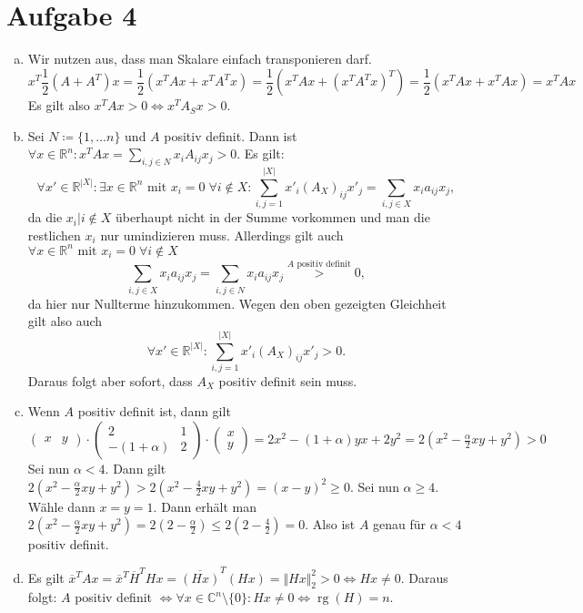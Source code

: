 \documentclass{article}
\theoremstyle{definition}
\newcommand{\equals}{\Longleftrightarrow}
\newcommand{\R}{\mathbb{R}}
\newcommand{\C}{\mathbb{C}}
\newcommand{\rg}{\operatorname{rg}}
\begin{document}
\section*{Aufgabe 4}
\begin{enumerate}[(a)]
	\item Wir nutzen aus, dass man Skalare einfach transponieren darf. 
	$$x^T \frac{1}{2}(A + A^T)x = \frac{1}{2}(x^TAx + x^TA^Tx) = \frac{1}{2}(x^TAx + (x^TA^Tx)^T) = \frac{1}{2}(x^TAx + x^TAx) = x^TAx$$
	Es gilt also $x^TAx> 0 \equals x^TA_Sx > 0$.
	\item Sei $N \coloneqq \{1, \dots n\}$ und $A$ positiv definit. Dann ist $\forall x\in \R^n: x^T Ax = \sum_{i,j \in N} x_i A_{ij}x_j > 0$. Es gilt: $$\forall x' \in \R^{|X|}: \exists x \in \R^n\text{ mit } x_i = 0\; \forall  i \notin X: \sum_{i,j = 1}^{|X|} x'_i (A_X)_{ij}x'_j = \sum_{i,j\in X} x_i a_{ij}x_j,$$ da die $x_i | i \notin X$ überhaupt nicht in der Summe vorkommen und man die restlichen $x_i$ nur umindizieren muss. Allerdings gilt auch $\forall x \in \R^n\text{ mit } x_i = 0\; \forall i \notin X$ $$\sum_{i,j\in X} x_i a_{ij}x_j = \sum_{i,j\in N} x_i a_{ij}x_j \overset{A \text{ positiv definit}}{>} 0,$$ da hier nur Nullterme hinzukommen. Wegen den oben gezeigten Gleichheit gilt also auch 
	$$\forall x' \in \R^{|X|}: \sum_{i,j = 1}^{|X|} x'_i (A_X)_{ij}x'_j >0.$$ Daraus folgt aber sofort, dass $A_X$ positiv definit sein muss.
	\item Wenn $A$ positiv definit ist, dann gilt$\begin{pmatrix}
		x & y
	\end{pmatrix}\cdot \begin{pmatrix}
		2 & 1\\
		-(1+\alpha) & 2
	\end{pmatrix} \cdot \begin{pmatrix}
		x \\y
	\end{pmatrix} = 2x^2 - (1 + \alpha)yx + 2y^2 = 2 (x^2 - \frac{\alpha}{2}xy + y^2) >0$
	Sei nun $\alpha < 4$. Dann gilt $2 (x^2 - \frac{\alpha}{2}xy + y^2) > 2 (x^2 - \frac{4}{2}xy + y^2) = (x-y)^2 \geq 0$. Sei nun $\alpha \geq 4$. Wähle dann $x = y = 1$. Dann erhält man $2(x^2 - \frac{\alpha}{2}xy + y^2) = 2(2 - \frac{\alpha}{2}) \leq 2(2-\frac{4}{2}) = 0$. Also ist $A$ genau für $\alpha <4$ positiv definit.
	\item Es gilt $\overline{x}^TAx = \overline{x}^T\overline{H}^THx = \overline{(Hx)}^T(Hx) = \Vert Hx \Vert_2^2 > 0 \equals Hx \neq 0$. Daraus folgt: $A$ positiv definit $\equals \forall x\in \C^n\setminus\{0\}: Hx \neq 0 \equals \rg(H) = n$.
\end{enumerate}
\end{document}
